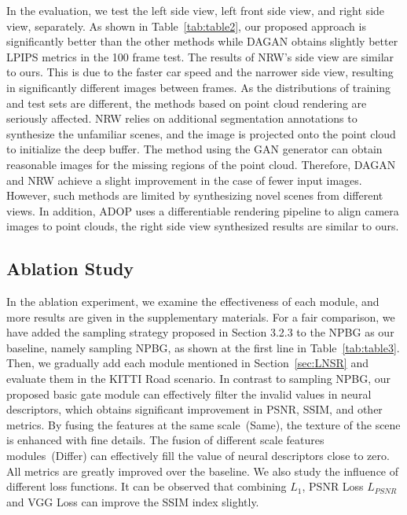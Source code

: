 \documentclass[sigconf]{acmart}
\begin{document}
In the evaluation, we test the left side view, left front side view, and right side view, separately. As shown in Table~\ref{tab:table2}, our proposed approach is significantly better than the other methods while DAGAN obtains slightly better LPIPS metrics in the 100 frame test. The results of NRW's side view are similar to ours. This is due to the faster car speed and the narrower side view, resulting in significantly different images between frames. As the distributions of training and test sets are different, the methods based on point cloud rendering are seriously affected. NRW relies on additional segmentation annotations to synthesize the unfamiliar scenes, and the image is projected onto the point cloud to initialize the deep buffer. The method using the GAN generator can obtain reasonable images for the missing regions of the point cloud. Therefore, DAGAN and NRW achieve a slight improvement in the case of fewer input images. However, such methods are limited by synthesizing novel scenes from different views. In addition, ADOP uses a differentiable rendering pipeline to align camera images to point clouds, the right side view synthesized results are similar to ours.
 






\subsection{Ablation Study}
In the ablation experiment, we examine the effectiveness of each module, and more results are given in the supplementary materials. For a fair comparison, we have added the sampling strategy proposed in Section 3.2.3 to the NPBG as our baseline, namely sampling NPBG, as shown at the first line in Table~\ref{tab:table3}. Then, we gradually add each module mentioned in Section~\ref{sec:LNSR} and evaluate them in the KITTI Road scenario. In contrast to sampling NPBG, our proposed basic gate module can effectively filter the invalid values in neural descriptors, which obtains significant improvement in PSNR, SSIM, and other metrics. By fusing the features at the same scale~(Same), the texture of the scene is enhanced with fine details. The fusion of different scale features modules~(Differ) can effectively fill the value of neural descriptors close to zero. All metrics are greatly improved over the baseline. We also study the influence of different loss functions. It can be observed that combining ${L_1}$, PSNR Loss $L_{PSNR}$ and VGG Loss can improve the SSIM index slightly.
\end{document}
